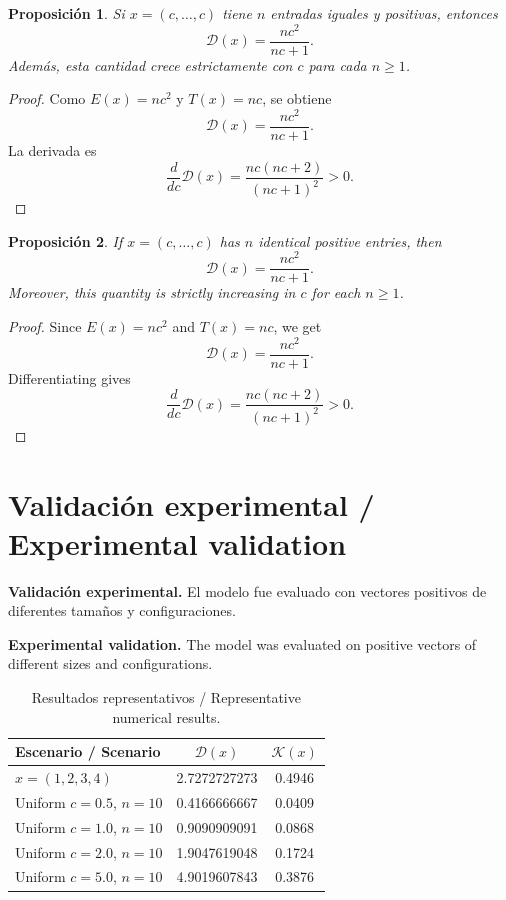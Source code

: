 \documentclass[11pt]{article}
\newtheorem{proposition}{Proposici\'on}
\begin{document}
\begin{proposition}
Si $x=(c,\ldots,c)$ tiene $n$ entradas iguales y positivas, entonces
\begin{equation}
\mathcal{D}(x)=\frac{n c^2}{n c +1}.
\end{equation}
Adem\'as, esta cantidad crece estrictamente con $c$ para cada $n\ge 1$.
\end{proposition}
\begin{proof}
Como $E(x)=nc^2$ y $T(x)=nc$, se obtiene
\begin{equation}
\mathcal{D}(x)=\frac{nc^2}{nc+1}.
\end{equation}
La derivada es
\begin{equation}
\frac{d}{dc}\mathcal{D}(x)=\frac{nc(nc+2)}{(nc+1)^2}>0.
\end{equation}
\end{proof}

\begin{proposition}
If $x=(c,\ldots,c)$ has $n$ identical positive entries, then
\begin{equation}
\mathcal{D}(x)=\frac{n c^2}{n c+1}.
\end{equation}
Moreover, this quantity is strictly increasing in $c$ for each $n\ge 1$.
\end{proposition}
\begin{proof}
Since $E(x)=nc^2$ and $T(x)=nc$, we get
\begin{equation}
\mathcal{D}(x)=\frac{nc^2}{nc+1}.
\end{equation}
Differentiating gives
\begin{equation}
\frac{d}{dc}\mathcal{D}(x)=\frac{nc(nc+2)}{(nc+1)^2}>0.
\end{equation}
\end{proof}

\section{Validaci\'on experimental / Experimental validation}
\textbf{Validaci\'on experimental.} El modelo fue evaluado con vectores positivos de diferentes tama\~nos y configuraciones.

\textbf{Experimental validation.} The model was evaluated on positive vectors of different sizes and configurations.

\begin{table}[h!]
\centering
\begin{tabular}{lcc}
\toprule
Escenario / Scenario & $\mathcal{D}(x)$ & $\mathcal{K}(x)$ \\
\midrule
$x=(1,2,3,4)$ & 2.7272727273 & 0.4946 \\
Uniform $c=0.5$, $n=10$ & 0.4166666667 & 0.0409 \\
Uniform $c=1.0$, $n=10$ & 0.9090909091 & 0.0868 \\
Uniform $c=2.0$, $n=10$ & 1.9047619048 & 0.1724 \\
Uniform $c=5.0$, $n=10$ & 4.9019607843 & 0.3876 \\
\bottomrule
\end{tabular}
\caption{Resultados representativos / Representative numerical results.}
\end{table}
\end{document}

